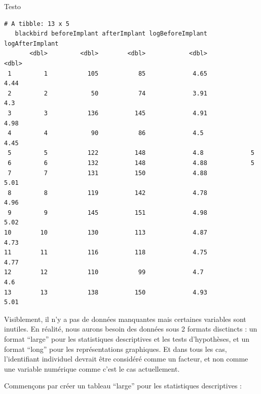 \documentclass[a4paperpaper,]{article}
\newenvironment{Shaded}{\begin{snugshade}}{\end{snugshade}}
\newcommand{\DataTypeTok}[1]{\textcolor[rgb]{0.00,0.34,0.68}{#1}}
\newcommand{\KeywordTok}[1]{\textcolor[rgb]{0.12,0.11,0.11}{\textbf{#1}}}
\newcommand{\NormalTok}[1]{\textcolor[rgb]{0.12,0.11,0.11}{#1}}
\newcommand{\OperatorTok}[1]{\textcolor[rgb]{0.12,0.11,0.11}{#1}}
\newcommand{\StringTok}[1]{\textcolor[rgb]{0.75,0.01,0.01}{#1}}
\begin{document}
\begin{Shaded}
\begin{Highlighting}[]
\NormalTok{Testo}
\end{Highlighting}
\end{Shaded}

\begin{verbatim}
# A tibble: 13 x 5
   blackbird beforeImplant afterImplant logBeforeImplant logAfterImplant
       <dbl>         <dbl>        <dbl>            <dbl>           <dbl>
 1         1           105           85             4.65            4.44
 2         2            50           74             3.91            4.3 
 3         3           136          145             4.91            4.98
 4         4            90           86             4.5             4.45
 5         5           122          148             4.8             5   
 6         6           132          148             4.88            5   
 7         7           131          150             4.88            5.01
 8         8           119          142             4.78            4.96
 9         9           145          151             4.98            5.02
10        10           130          113             4.87            4.73
11        11           116          118             4.75            4.77
12        12           110           99             4.7             4.6 
13        13           138          150             4.93            5.01
\end{verbatim}

Visiblement, il n'y a pas de données manquantes mais certaines variables sont inutiles. En réalité, nous aurons besoin des données sous 2 formats disctincts : un format ``large'' pour les statistiques descriptives et les tests d'hypothèses, et un format ``long'' pour les représentations graphiques. Et dans tous les cas, l'identifiant individuel devrait être considéré comme un facteur, et non comme une variable numérique comme c'est le cas actuellement.

Commençons par créer un tableau ``large'' pour les statistiques descriptives :

\begin{Shaded}
\end{Shaded}
\end{document}
